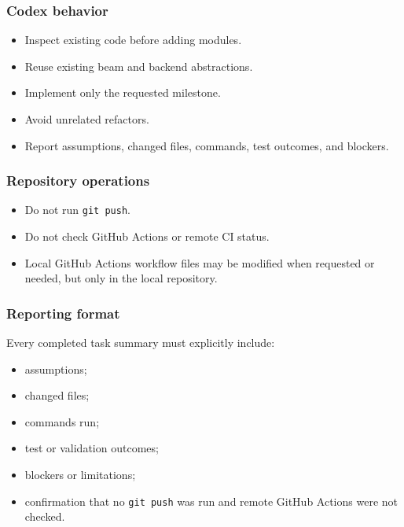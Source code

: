 \documentclass[
]{article}
\providecommand{\tightlist}{%
  \setlength{\itemsep}{0pt}\setlength{\parskip}{0pt}}
\begin{document}
\hypertarget{codex-behavior}{%
\subsubsection{Codex behavior}\label{codex-behavior}}

\begin{itemize}
\tightlist
\item
  Inspect existing code before adding modules.
\item
  Reuse existing beam and backend abstractions.
\item
  Implement only the requested milestone.
\item
  Avoid unrelated refactors.
\item
  Report assumptions, changed files, commands, test outcomes, and
  blockers.
\end{itemize}

\hypertarget{repository-operations}{%
\subsubsection{Repository operations}\label{repository-operations}}

\begin{itemize}
\tightlist
\item
  Do not run \texttt{git\ push}.
\item
  Do not check GitHub Actions or remote CI status.
\item
  Local GitHub Actions workflow files may be modified when requested or
  needed, but only in the local repository.
\end{itemize}

\hypertarget{reporting-format}{%
\subsubsection{Reporting format}\label{reporting-format}}

Every completed task summary must explicitly include:

\begin{itemize}
\tightlist
\item
  assumptions;
\item
  changed files;
\item
  commands run;
\item
  test or validation outcomes;
\item
  blockers or limitations;
\item
  confirmation that no \texttt{git\ push} was run and remote GitHub
  Actions were not checked.
\end{itemize}
\end{document}
